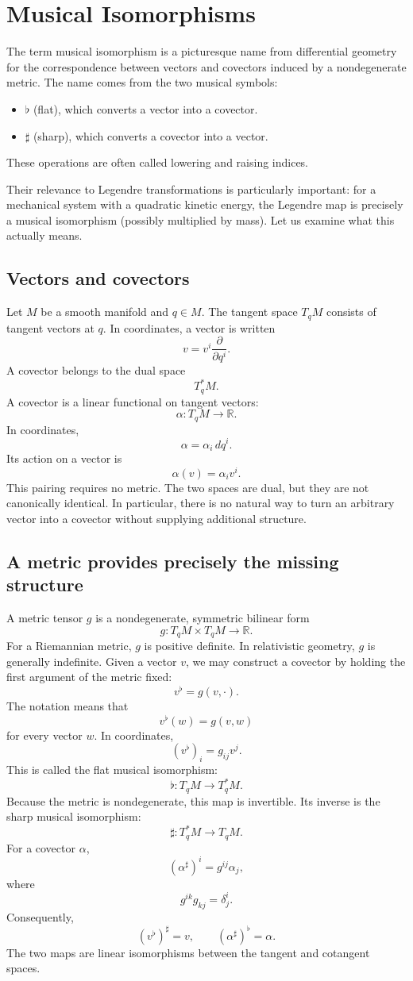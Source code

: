 \section{Musical Isomorphisms}
\label{sec:math-musical}
The term musical isomorphism is a picturesque name from differential geometry
for the correspondence between vectors and covectors induced by a nondegenerate
metric.
The name comes from the two musical symbols:
\begin{itemize}
   \item \(\flat\) (flat), which converts a vector into a covector.
   \item \(\sharp\) (sharp), which converts a covector into a vector.
\end{itemize}
These operations are often called lowering and raising indices.

Their relevance to  Legendre transformations is particularly
important: for a mechanical system with a quadratic kinetic energy, the
Legendre map is precisely a musical isomorphism (possibly multiplied by mass).
Let us examine what this actually means.

\subsection{Vectors and covectors }
Let \(M\) be a smooth manifold and \(q\in M\).
The tangent space \(T_qM\) consists of tangent vectors at \(q\). In
coordinates, a vector is written
\[
v=v^i\frac{\partial}{\partial q^i}.
\]
A covector belongs to the dual space
\[
T_q^*M.
\]
A covector is a linear functional on tangent vectors:
\[
\alpha:T_qM\longrightarrow\mathbb R.
\]
In coordinates,
\[
\alpha=\alpha_i\,dq^i.
\]
Its action on a vector is
\[
\boxed{\alpha(v)=\alpha_iv^i.}
\]
This pairing requires no metric.
The two spaces are dual, but they are not canonically identical.
In particular, there is no natural way to turn an arbitrary vector into a
covector without supplying additional structure.

\subsection{ A metric provides precisely the missing structure}
A metric tensor \(g\) is a nondegenerate, symmetric bilinear form
\[
g:T_qM\times T_qM\longrightarrow\mathbb R.
\]
For a Riemannian metric, \(g\) is positive definite. In relativistic geometry,
\(g\) is generally indefinite.
Given a vector \(v\), we may construct a covector by holding the first argument
of the metric fixed:
\[
\boxed{v^\flat=g(v,\cdot).}
\]
The notation means that
\[
v^\flat(w)=g(v,w)
\]
for every vector \(w\).
In coordinates,
\[
\boxed{(v^\flat)_i=g_{ij}v^j.}
\]
This is called the flat musical isomorphism:
\[
\flat:T_qM\longrightarrow T_q^*M.
\]
Because the metric is nondegenerate, this map is invertible.
Its inverse is the sharp musical isomorphism:
\[
\sharp:T_q^*M\longrightarrow T_qM.
\]
For a covector \(\alpha\),
\[
\boxed{(\alpha^\sharp)^i=g^{ij}\alpha_j,}
\]
where
\[
g^{ik}g_{kj}=\delta^i_j.
\]
Consequently,
\[
\boxed{
(v^\flat)^\sharp=v,
\qquad
(\alpha^\sharp)^\flat=\alpha.
}
\]
The two maps are linear isomorphisms between the tangent and cotangent spaces.

